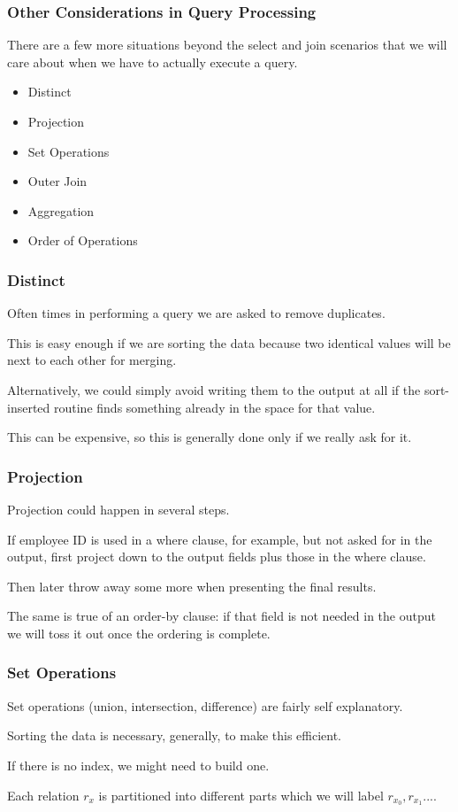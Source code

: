 \begin{frame}
\frametitle{Other Considerations in Query Processing}

There are a few more situations beyond the select and join scenarios that we will care about when we have to actually execute a query.

\begin{itemize}
	\item Distinct
	\item Projection
	\item Set Operations
	\item Outer Join
	\item Aggregation
	\item Order of Operations
\end{itemize}


\end{frame}

\begin{frame}
\frametitle{Distinct}

Often times in performing a query we are asked to remove duplicates. 

This is easy enough if we are sorting the data because two identical values will be next to each other for merging. 

Alternatively, we could simply avoid writing them to the output at all if the sort-inserted routine finds something already in the space for that value. 

This can be expensive, so this is generally done only if we really ask for it.

\end{frame}

\begin{frame}
\frametitle{Projection}

Projection could happen in several steps. 

If employee ID is used in a where clause, for example, but not asked for in the output, first project down to the output fields plus those in the where clause.

Then later throw away some more when presenting the final results. 

The same is true of an order-by clause: if that field is not needed in the output we will toss it out once the ordering is complete.
\end{frame}

\begin{frame}
\frametitle{Set Operations}

Set operations (union, intersection, difference) are fairly self explanatory. 

Sorting the data is necessary, generally, to make this efficient. 

If there is no index, we might need to build one. 

Each relation $r_{x}$ is partitioned into different parts which we will label $r_{x_{0}}, r_{x_{1}}...$. 

\end{frame}

